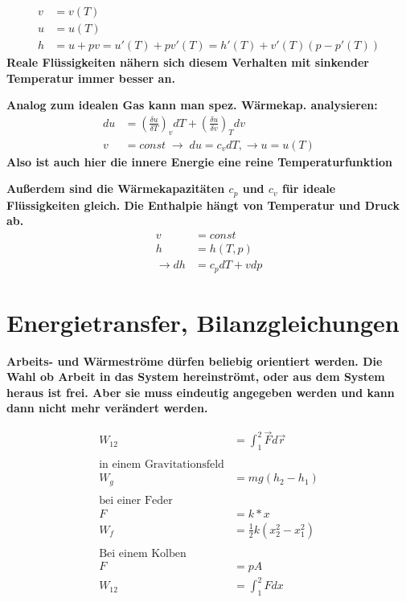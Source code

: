 \documentclass[12pt]{article}
\begin{document}
\begin{tcolorbox}[colback=backblue,colframe=borderblue,title=Important]
\begin{align*}
v &= v(T) \\
u &= u(T) \\
h &= u + pv = u'(T) + pv'(T) = h'(T) + v'(T)(p-p'(T))
\end{align*}
\textbf{Reale Flüssigkeiten nähern sich diesem Verhalten mit sinkender Temperatur immer besser an.}
\end{tcolorbox}
\bigskip
\textbf{Analog zum idealen Gas kann man spez. Wärmekap. analysieren: }
\begin{align*}
du&=\left(\frac{\delta u}{\delta T}\right)_vdT + \left(\frac{\delta u}{\delta v}\right)_T dv\\
v&=const \; \rightarrow \; du =c_v dT, \rightarrow u=u(T)
\end{align*}
\textbf{Also ist auch hier die innere Energie eine reine Temperaturfunktion}
\\
\begin{tcolorbox}[colback=backblue,colframe=borderblue,title=Important]
\textbf{Außerdem sind die Wärmekapazitäten $c_p$ und $c_v$ für ideale Flüssigkeiten gleich. Die Enthalpie hängt von Temperatur und Druck ab.}
\begin{align*}
v&=const \\
h&=h(T,p)\\
\rightarrow dh&=c_p dT + vdp
\end{align*}
\end{tcolorbox}


\pagebreak
\section{Energietransfer, Bilanzgleichungen}

\textbf{Arbeits- und Wärmeströme dürfen beliebig orientiert werden. Die Wahl ob Arbeit in das System hereinströmt, oder aus dem System heraus ist frei. Aber sie muss eindeutig angegeben werden und kann dann nicht mehr verändert werden.}

\begin{align*}
W_{12} &= \int _1 ^2 \vec{F} d\vec{r} \\ \\
\text{in einem Gravitationsfeld} \\
W_g&=mg(h_2-h_1) \\ \\
\text{bei einer Feder} \\
F &= k*x \\
W_f &= \frac{1}{2}k(x_2^2 - x_1^2)\\ \\
\text{Bei einem Kolben} \\
F &= pA \\
W_{12} &= \int _1 ^2 F dx \\ \\
\end{align*}
\end{document}
